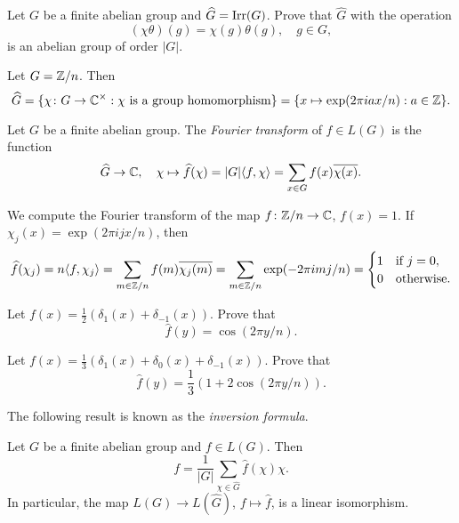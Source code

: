 \begin{exercise}
\label{xca:dual}
	Let $G$ be a finite abelian group and $\widehat{G}=\operatorname{Irr}(G)$. 
    Prove that $\widehat{G}$ with the operation 
    \[
	(\chi\theta)(g)=\chi(g)\theta(g),\quad g\in G,
    \]
    is an abelian group of order $|G|$.
\end{exercise}
 
\begin{example}
  Let $G=\mathbb{Z}/n$. Then
  \[
    \widehat{G}=\{\chi\colon G\to\mathbb{C}^\times:\text{$\chi$ is a group homomorphism}\}=\{x\mapsto \exp(2\pi iax/n):a\in\mathbb{Z}\}.
  \]
\end{example}

\begin{definition}
  Let $G$ be a finite abelian group. The \emph{Fourier 
  transform} of $f\in L(G)$ is the function 
  \[
	\widehat{G}\to\mathbb{C},\quad
	\chi\mapsto\widehat{f}(\chi)
	=|G|\langle f,\chi\rangle=\sum_{x\in G}f(x)\overline{\chi(x)}.
  \]
\end{definition}

\begin{example}
  We compute the Fourier transform of the map
  $f\colon\mathbb{Z}/n\to\mathbb{C}$, $f(x)=1$. If
  $\chi_j(x)=\exp(2\pi ijx/n)$, then 
  \[
	\widehat{f}(\chi_j)=n\langle f,\chi_j\rangle
	=\sum_{m\in\mathbb{Z}/n}f(m)\overline{\chi_j(m)}
	=\sum_{m\in\mathbb{Z}/n}\exp(-2\pi imj/n)
	=\begin{cases}
	  1 & \text{if $j=0$},\\
	  0 & \text{otherwise}.
	\end{cases}
  \]
\end{example}

\begin{exercise}
    Let $f(x)=\frac12(\delta_1(x)+\delta_{-1}(x))$. Prove that 
    \[
      \widehat{f}(y)=\cos (2\pi y/n). 
    \]
\end{exercise}

\begin{exercise}
    Let $f(x)=\frac13(\delta_1(x)+\delta_0(x)+\delta_{-1}(x))$. Prove that
    \[
      \widehat{f}(y)=\frac13(1+2\cos(2\pi y/n)). 
    \]
\end{exercise}

The following result is known as the 
\emph{inversion formula}. 

\begin{proposition}
  \label{pro:inversion_abelian}
  Let $G$ be a finite abelian group and $f\in L(G)$. Then 
  \[
    f=\frac{1}{|G|}\sum_{\chi\in\widehat{G}}\widehat{f}(\chi)\chi.
  \]
  In particular, the map $L(G)\to L(\widehat{G})$, 
  $f\mapsto\widehat{f}$, is a linear isomorphism. 
\end{proposition}

